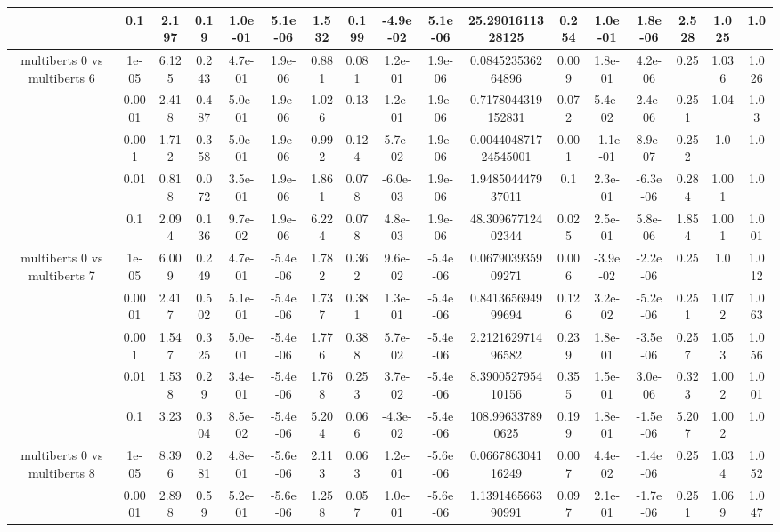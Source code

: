 \begin{tabular}{|c|c|c|c|c|c|c|c|c|c|c|c|c|c|c|c|c|}
 & 0.1 & 2.197 & 0.19 & 1.0e-01 & 5.1e-06 & 1.532 & 0.199 & -4.9e-02 & 5.1e-06 & 25.2901611328125 & 0.254 & 1.0e-01 & 1.8e-06 & 2.528 & 1.025 & 1.0 \\
\hline
\multirow{5}{*}{multiberts 0 vs multiberts 6} & 1e-05 & 6.125 & 0.243 & 4.7e-01 & 1.9e-06 & 0.881 & 0.081 & 1.2e-01 & 1.9e-06 & 0.084523536264896 & 0.009 & 1.8e-01 & 4.2e-06 & 0.25 & 1.036 & 1.026 \\
 & 0.0001 & 2.418 & 0.487 & 5.0e-01 & 1.9e-06 & 1.026 & 0.13 & 1.2e-01 & 1.9e-06 & 0.7178044319152831 & 0.072 & 5.4e-02 & 2.4e-06 & 0.251 & 1.04 & 1.03 \\
 & 0.001 & 1.712 & 0.358 & 5.0e-01 & 1.9e-06 & 0.992 & 0.124 & 5.7e-02 & 1.9e-06 & 0.004404871724545001 & 0.001 & -1.1e-01 & 8.9e-07 & 0.252 & 1.0 & 1.0 \\
 & 0.01 & 0.818 & 0.072 & 3.5e-01 & 1.9e-06 & 1.861 & 0.078 & -6.0e-03 & 1.9e-06 & 1.948504447937011 & 0.1 & 2.3e-01 & -6.3e-06 & 0.284 & 1.001 & 1.0 \\
 & 0.1 & 2.094 & 0.136 & 9.7e-02 & 1.9e-06 & 6.224 & 0.078 & 4.8e-03 & 1.9e-06 & 48.30967712402344 & 0.025 & 2.5e-01 & 5.8e-06 & 1.854 & 1.001 & 1.001 \\
\hline
\multirow{5}{*}{multiberts 0 vs multiberts 7} & 1e-05 & 6.009 & 0.249 & 4.7e-01 & -5.4e-06 & 1.782 & 0.362 & 9.6e-02 & -5.4e-06 & 0.067903935909271 & 0.006 & -3.9e-02 & -2.2e-06 & 0.25 & 1.0 & 1.012 \\
 & 0.0001 & 2.417 & 0.502 & 5.1e-01 & -5.4e-06 & 1.737 & 0.381 & 1.3e-01 & -5.4e-06 & 0.841365694999694 & 0.126 & 3.2e-02 & -5.2e-06 & 0.251 & 1.072 & 1.063 \\
 & 0.001 & 1.547 & 0.325 & 5.0e-01 & -5.4e-06 & 1.776 & 0.388 & 5.7e-02 & -5.4e-06 & 2.212162971496582 & 0.239 & 1.8e-01 & -3.5e-06 & 0.257 & 1.053 & 1.056 \\
 & 0.01 & 1.538 & 0.29 & 3.4e-01 & -5.4e-06 & 1.768 & 0.253 & 3.7e-02 & -5.4e-06 & 8.390052795410156 & 0.355 & 1.5e-01 & 3.0e-06 & 0.323 & 1.002 & 1.001 \\
 & 0.1 & 3.23 & 0.304 & 8.5e-02 & -5.4e-06 & 5.204 & 0.066 & -4.3e-02 & -5.4e-06 & 108.996337890625 & 0.199 & 1.8e-01 & -1.5e-06 & 5.207 & 1.002 & 1.0 \\
\hline
\multirow{5}{*}{multiberts 0 vs multiberts 8} & 1e-05 & 8.396 & 0.281 & 4.8e-01 & -5.6e-06 & 2.113 & 0.063 & 1.2e-01 & -5.6e-06 & 0.066786304116249 & 0.007 & 4.4e-02 & -1.4e-06 & 0.25 & 1.034 & 1.052 \\
 & 0.0001 & 2.898 & 0.59 & 5.2e-01 & -5.6e-06 & 1.258 & 0.057 & 1.0e-01 & -5.6e-06 & 1.139146566390991 & 0.097 & 2.1e-01 & -1.7e-06 & 0.251 & 1.069 & 1.047 \\

\end{tabular}
